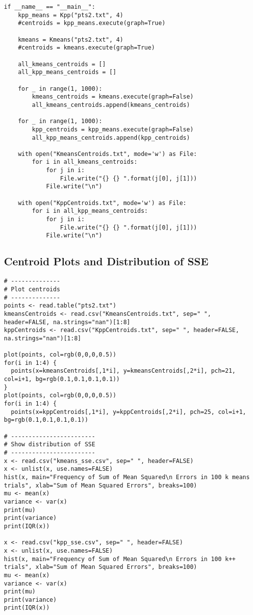 \begin{verbatim}
if __name__ == "__main__":
    kpp_means = Kpp("pts2.txt", 4)
    #centroids = kpp_means.execute(graph=True)

    kmeans = Kmeans("pts2.txt", 4)
    #centroids = kmeans.execute(graph=True)

    all_kmeans_centroids = []
    all_kpp_means_centroids = []

    for _ in range(1, 1000):
        kmeans_centroids = kmeans.execute(graph=False)
        all_kmeans_centroids.append(kmeans_centroids)

    for _ in range(1, 1000):
        kpp_centroids = kpp_means.execute(graph=False)
        all_kpp_means_centroids.append(kpp_centroids)

    with open("KmeansCentroids.txt", mode='w') as File:
        for i in all_kmeans_centroids:
            for j in i:
                File.write("{} {} ".format(j[0], j[1]))
            File.write("\n")

    with open("KppCentroids.txt", mode='w') as File:
        for i in all_kpp_means_centroids:
            for j in i:
                File.write("{} {} ".format(j[0], j[1]))
            File.write("\n")
\end{verbatim}

\subsection {Centroid Plots and Distribution of SSE}
\begin{verbatim}
# --------------
# Plot centroids
# --------------
points <- read.table("pts2.txt")
kmeansCentroids <- read.csv("KmeansCentroids.txt", sep=" ", header=FALSE, na.strings="nan")[1:8]
kppCentroids <- read.csv("KppCentroids.txt", sep=" ", header=FALSE, na.strings="nan")[1:8]

plot(points, col=rgb(0,0,0,0.5))
for(i in 1:4) {
  points(x=kmeansCentroids[,1*i], y=kmeansCentroids[,2*i], pch=21, col=i+1, bg=rgb(0.1,0.1,0.1,0.1))
}
plot(points, col=rgb(0,0,0,0.5))
for(i in 1:4) {
  points(x=kppCentroids[,1*i], y=kppCentroids[,2*i], pch=25, col=i+1, bg=rgb(0.1,0.1,0.1,0.1))

# ------------------------
# Show distribution of SSE
# ------------------------
x <- read.csv("kmeans_sse.csv", sep=" ", header=FALSE)
x <- unlist(x, use.names=FALSE)
hist(x, main="Frequency of Sum of Mean Squared\n Errors in 100 k means trials", xlab="Sum of Mean Squared Errors", breaks=100)
mu <- mean(x)
variance <- var(x)
print(mu)
print(variance)
print(IQR(x))

x <- read.csv("kpp_sse.csv", sep=" ", header=FALSE)
x <- unlist(x, use.names=FALSE)
hist(x, main="Frequency of Sum of Mean Squared\n Errors in 100 k++ trials", xlab="Sum of Mean Squared Errors", breaks=100)
mu <- mean(x)
variance <- var(x)
print(mu)
print(variance)
print(IQR(x))
\end{verbatim}
